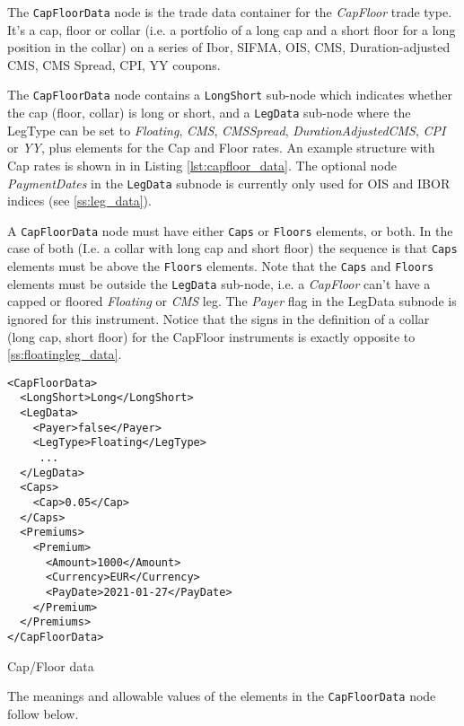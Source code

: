 The \lstinline!CapFloorData! node is the trade data container for the \emph{CapFloor} trade type.  It's a cap, floor or
collar (i.e. a portfolio of a long cap and a short floor for a long position in the collar) on a series of Ibor, SIFMA,
OIS, CMS, Duration-adjusted CMS, CMS Spread, CPI, YY coupons.

The \lstinline!CapFloorData! node contains a \lstinline!LongShort! sub-node which indicates whether the cap (floor, collar)
is long or short, and a \lstinline!LegData!  sub-node where the
LegType can be set to \emph{Floating}, \emph{CMS}, \emph{CMSSpread}, \emph{DurationAdjustedCMS}, \emph{CPI}
or \emph{YY}, plus elements for the Cap and Floor rates. An example structure with Cap rates is shown in in Listing
\ref{lst:capfloor_data}. The optional node \emph{PaymentDates} in the \lstinline!LegData! subnode is currently only used for OIS and IBOR indices (see \ref{ss:leg_data}).

A \lstinline!CapFloorData! node must have either \lstinline!Caps! or \lstinline!Floors!
elements, or both. In the case of both (I.e. a collar with long cap and short floor) the sequence is that  \lstinline!Caps! elements must be above the \lstinline!Floors! elements. Note that 
the \lstinline!Caps! and \lstinline!Floors! elements must be outside the \lstinline!LegData! sub-node, i.e. a \emph{CapFloor} 
can't have a capped or floored  \emph{Floating}  or \emph{CMS} leg.
The \emph{Payer} flag in the LegData subnode is ignored for this instrument. Notice that the signs in the definition of a collar (long cap, short floor) for the CapFloor
instruments is exactly opposite to \ref{ss:floatingleg_data}.

\begin{listing}[H]
\begin{verbatim}
<CapFloorData>
  <LongShort>Long</LongShort>
  <LegData>
    <Payer>false</Payer>
    <LegType>Floating</LegType>
     ...
  </LegData>
  <Caps>
    <Cap>0.05</Cap>
  </Caps>
  <Premiums>
    <Premium>
      <Amount>1000</Amount>
      <Currency>EUR</Currency>
      <PayDate>2021-01-27</PayDate>
    </Premium>
  </Premiums>
</CapFloorData>
\end{verbatim}
\caption{Cap/Floor data}
\label{lst:capfloor_data}
\end{listing}

The meanings and allowable values of the elements in the \lstinline!CapFloorData!  node follow below.

